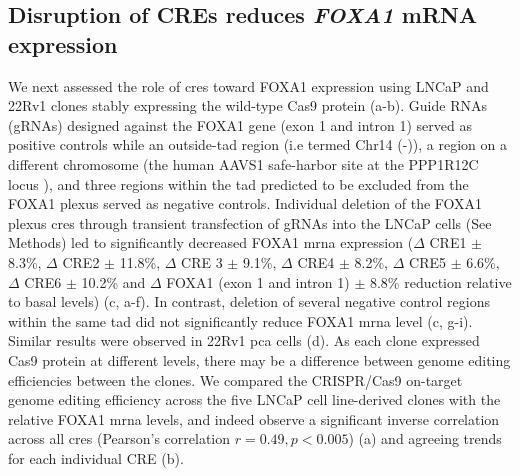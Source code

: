 
\subsection{Disruption of CREs reduces \emph{FOXA1} mRNA expression}

We next assessed the role of \glspl{cre} toward FOXA1 expression using LNCaP and 22Rv1 clones stably expressing the wild-type Cas9 protein (a-b).
Guide RNAs (gRNAs) designed against the FOXA1 gene (exon 1 and intron 1) served as positive controls while an outside-\gls{tad} region (i.e termed Chr14 (-)), a region on a different chromosome (the human AAVS1 safe-harbor site at the PPP1R12C locus \cite{kronTMPRSS2ERGFusion2017,dekelverFunctionalGenomicsProteomics2010}), and three regions within the \gls{tad} predicted to be excluded from the FOXA1 plexus served as negative controls.
Individual deletion of the FOXA1 plexus \glspl{cre} through transient transfection of gRNAs into the LNCaP cells (See Methods) led to significantly decreased FOXA1 \gls{mrna} expression ($\Delta$ CRE1  $\pm$ 8.3\%, $\Delta$ CRE2  $\pm$ 11.8\%, $\Delta$ CRE 3  $\pm$ 9.1\%, $\Delta$ CRE4  $\pm$ 8.2\%, $\Delta$ CRE5  $\pm$ 6.6\%, $\Delta$ CRE6  $\pm$ 10.2\% and $\Delta$ FOXA1 (exon 1 and intron 1)  $\pm$ 8.8\% reduction relative to basal levels) (c, a-f).
In contrast, deletion of several negative control regions within the same \gls{tad} did not significantly reduce FOXA1 \gls{mrna} level (c, g-i).
Similar results were observed in 22Rv1 \gls{pca} cells (d).
As each clone expressed Cas9 protein at different levels, there may be a difference between genome editing efficiencies between the clones.
We compared the CRISPR/Cas9 on-target genome editing efficiency across the five LNCaP cell line-derived clones with the relative FOXA1 \gls{mrna} levels, and indeed observe a significant inverse correlation across all \glspl{cre} (Pearson's correlation $r = 0.49, p < 0.005$) (a) and agreeing trends for each individual CRE (b).

